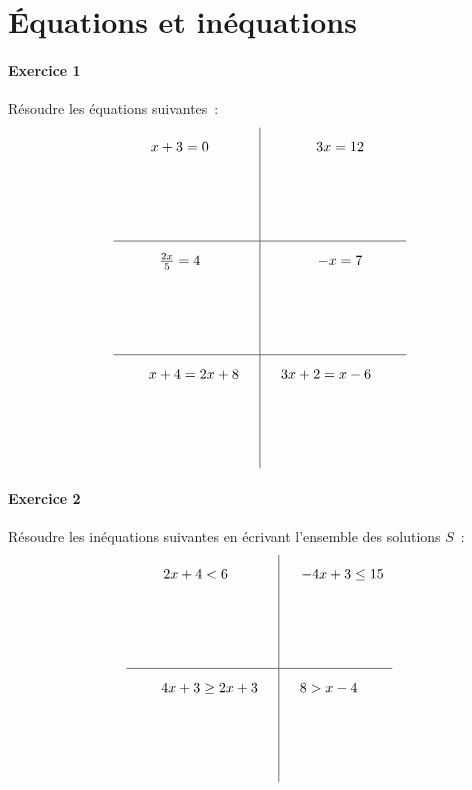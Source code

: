 \documentclass[a4paper]{article}
\begin{document}
  \section*{Équations et inéquations}
  \paragraph{Exercice 1}
  Résoudre les équations suivantes~:
  \[
    \def\arraystretch{2}
    \begin{array}{c|c}
      x + 3 = 0 \quad&\quad 3x = 12\\[2cm]
      \hline
      \frac{2x}{5} = 4 \quad&\quad -x = 7\\[2cm]
      \hline
      \quad\quad x + 4 = 2x + 8 \quad&\quad 3x + 2 = x - 6 \quad\quad\\[2cm]
    \end{array}
  \]

  \paragraph{Exercice 2}
  Résoudre les inéquations suivantes en écrivant l'ensemble des solutions $S$~:
  \[
    \def\arraystretch{2}
    \begin{array}{c|c}
      2x + 4 < 6 \quad&\quad -4x + 3 \leq 15\\[2cm]
      \hline
      \quad\quad 4x + 3 \geq 2x + 3 \quad&\quad 8 > x - 4 \quad\quad\\[2cm]
    \end{array}
  \]  
\end{document}
